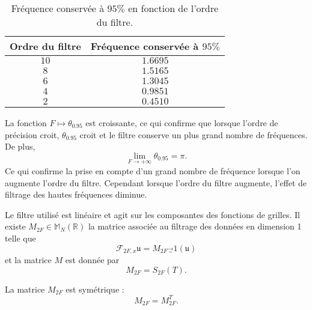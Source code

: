 \begin{table}
\begin{center}
\begin{tabular}{|c||c|}
\hline
\textbf{Ordre du filtre} & \textbf{Fréquence conservée à } $95\%$\\
\hline
\hline
$10$&$1.6695$\\
$8$&$1.5165$\\
$6$&$1.3045$\\
$4$&$0.9851$\\
$2$&$0.4510$\\
\hline
\end{tabular}
\end{center}
\caption{Fréquence conservée à $95\%$ en fonction de l'ordre du filtre.}
\label{tab:filter_095}
\end{table}

La fonction $F \mapsto \theta_{0.95}$ est croissante, ce qui confirme que lorsque l'ordre de précision croit, $\theta_{0.95}$ croit et le filtre conserve un plus grand nombre de fréquences. De plus, 
\begin{equation}
\lim_{F \rightarrow +\infty} \theta_{0.95} = \pi.
\end{equation}
Ce qui confirme la prise en compte d'un grand nombre de fréquence lorsque l'on augmente l'ordre du filtre. Cependant lorsque l'ordre du filtre augmente, l'effet de filtrage des hautes fréquences diminue.

Le filtre utilisé est linéaire et agit sur les composantes des fonctions de grilles. Il existe $M_{2F} \in \mathbb{M}_N \left( \mathbb{R} \right)$ la matrice associée au filtrage des données en dimension 1 telle que
\begin{equation}
\mathcal{F}_{2F,x} \mathfrak{u} = M_{2F} \vec_1(\mathfrak{u})
\end{equation}
et la matrice $M$ est donnée par
\begin{equation}
M_{2F} = S_{2F}(T).
\label{eq:matrice_filtrage}
\end{equation}

\begin{proposition}
La matrice $M_{2F}$ est symétrique :
\begin{equation}
M_{2F} = M^T_{2F}.
\end{equation}
\end{proposition}

































